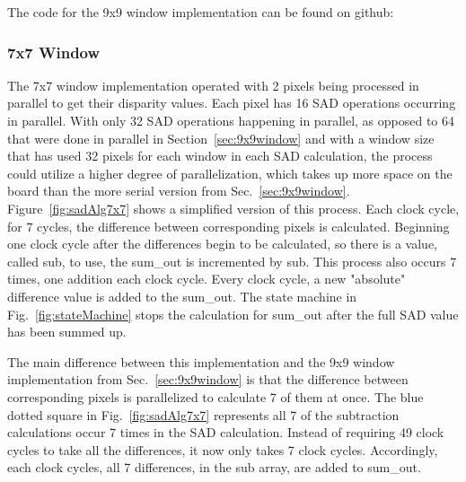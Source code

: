 The code for the 9x9 window implementation can be found on github:
\\

\subsubsection{7x7 Window}

The 7x7 window implementation operated with 2 pixels being processed in parallel to get their disparity values. Each pixel has 16 SAD operations occurring in parallel. With only 32 SAD operations happening in parallel, as opposed to 64 that were done in parallel in Section~\ref{sec:9x9window} and with a window size that has used 32 pixels for each window in each SAD calculation, the process could utilize a higher degree of parallelization, which takes up more space on the board than the more serial version from Sec.~\ref{sec:9x9window}. Figure~\ref{fig:sadAlg7x7} shows a simplified version of this process. Each clock cycle, for 7 cycles, the difference between corresponding pixels is calculated. Beginning one clock cycle after the differences begin to be calculated, so there is a value, called sub, to use, the sum\_out is incremented by sub. This process also occurs 7 times, one addition each clock cycle. Every clock cycle, a new "absolute" difference value is added to the sum\_out. The state machine in Fig.~\ref{fig:stateMachine} stops the calculation for sum\_out after the full SAD value has been summed up.

The main difference between this implementation and the 9x9 window implementation from Sec.~\ref{sec:9x9window} is that the difference between corresponding pixels is parallelized to calculate 7 of them at once. The blue dotted square in Fig.~\ref{fig:sadAlg7x7} represents all 7 of the subtraction calculations occur 7 times in the SAD calculation. Instead of requiring 49 clock cycles to take all the differences, it now only takes 7 clock cycles. Accordingly, each clock cycles, all 7 differences, in the sub array, are added to sum\_out.

